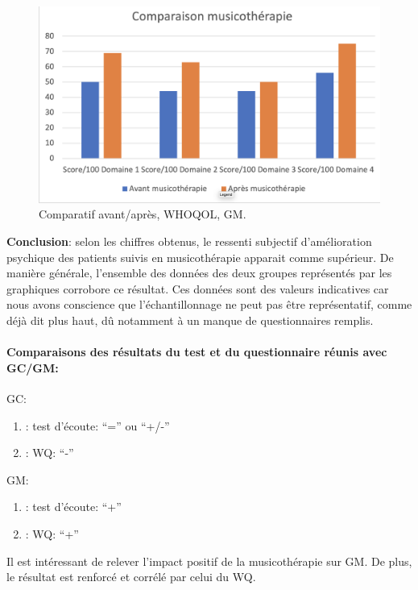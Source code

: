\begin{figure}
\centering
\includegraphics[width=0.7\linewidth]{images/Compmusico.png}
\caption[Schéma du déroulement]{Comparatif  avant/après, WHOQOL, GM.}
       
\label{groupecontroleimage1}
\end{figure}



       \textbf{ Conclusion}: selon les chiffres obtenus, le ressenti
       subjectif d'amélioration psychique 
        des patients suivis en musicothérapie apparait comme
        supérieur.
        De manière générale, l'ensemble des données des deux groupes représentés
        par les graphiques corrobore ce résultat.
        Ces données sont des valeurs indicatives car nous avons conscience que l'échantillonnage ne
        peut pas être représentatif, comme déjà dit plus haut, dû
        notamment à un
        manque de
        questionnaires remplis.
  \paragraph{ Comparaisons des résultats du test et du questionnaire
    réunis avec GC/GM:}


  
  GC:
  \begin{enumerate}
 		\item : test d'écoute: ``='' ou ``+/-''
 		\item : WQ: ``-''
                  
            \end{enumerate}
GM:
  \begin{enumerate}
 		\item : test d'écoute: ``+''
 		\item : WQ: ``+''
                  
               \end{enumerate}

                Il est intéressant de relever l'impact positif de la
                musicothérapie sur GM.
                De plus, le résultat est renforcé et corrélé par celui du WQ.
                


